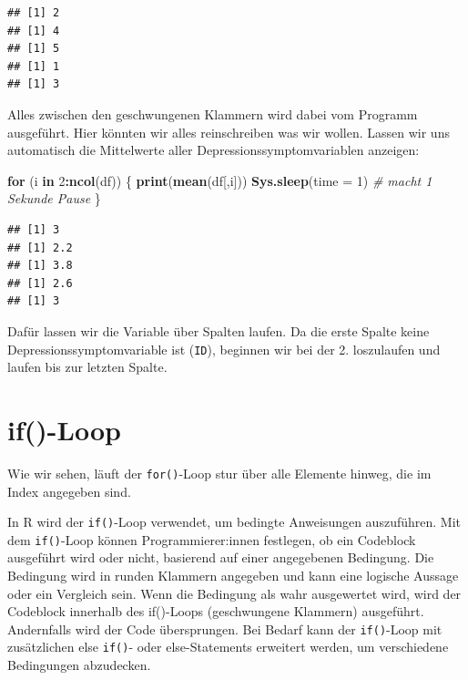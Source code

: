 \documentclass[
]{book}
\newenvironment{Shaded}{\begin{snugshade}}{\end{snugshade}}
\newcommand{\AttributeTok}[1]{\textcolor[rgb]{0.13,0.29,0.53}{#1}}
\newcommand{\CommentTok}[1]{\textcolor[rgb]{0.56,0.35,0.01}{\textit{#1}}}
\newcommand{\ControlFlowTok}[1]{\textcolor[rgb]{0.13,0.29,0.53}{\textbf{#1}}}
\newcommand{\DecValTok}[1]{\textcolor[rgb]{0.00,0.00,0.81}{#1}}
\newcommand{\FunctionTok}[1]{\textcolor[rgb]{0.13,0.29,0.53}{\textbf{#1}}}
\newcommand{\NormalTok}[1]{#1}
\newcommand{\SpecialCharTok}[1]{\textcolor[rgb]{0.81,0.36,0.00}{\textbf{#1}}}
\begin{document}
\begin{Shaded}
\end{Shaded}

\begin{verbatim}
## [1] 2
## [1] 4
## [1] 5
## [1] 1
## [1] 3
\end{verbatim}

Alles zwischen den geschwungenen Klammern wird dabei vom Programm ausgeführt. Hier könnten wir alles reinschreiben was wir wollen. Lassen wir uns automatisch die Mittelwerte aller Depressionssymptomvariablen anzeigen:

\begin{Shaded}
\begin{Highlighting}[]
\ControlFlowTok{for}\NormalTok{ (i }\ControlFlowTok{in} \DecValTok{2}\SpecialCharTok{:}\FunctionTok{ncol}\NormalTok{(df)) \{}
  \FunctionTok{print}\NormalTok{(}\FunctionTok{mean}\NormalTok{(df[,i]))}
  \FunctionTok{Sys.sleep}\NormalTok{(}\AttributeTok{time =} \DecValTok{1}\NormalTok{) }\CommentTok{\# macht 1 Sekunde Pause}
\NormalTok{\}}
\end{Highlighting}
\end{Shaded}

\begin{verbatim}
## [1] 3
## [1] 2.2
## [1] 3.8
## [1] 2.6
## [1] 3
\end{verbatim}

Dafür lassen wir die Variable über Spalten laufen. Da die erste Spalte keine Depressionssymptomvariable ist (\texttt{ID}), beginnen wir bei der 2. loszulaufen und laufen bis zur letzten Spalte.

\section{if()-Loop}\label{if-loop}

Wie wir sehen, läuft der \texttt{for()}-Loop stur über alle Elemente hinweg, die im Index angegeben sind.

In R wird der \texttt{if()}-Loop verwendet, um bedingte Anweisungen auszuführen. Mit dem \texttt{if()}-Loop können Programmierer:innen festlegen, ob ein Codeblock ausgeführt wird oder nicht, basierend auf einer angegebenen Bedingung. Die Bedingung wird in runden Klammern angegeben und kann eine logische Aussage oder ein Vergleich sein. Wenn die Bedingung als wahr ausgewertet wird, wird der Codeblock innerhalb des if()-Loops (geschwungene Klammern) ausgeführt. Andernfalls wird der Code übersprungen. Bei Bedarf kann der \texttt{if()}-Loop mit zusätzlichen else \texttt{if()}- oder else-Statements erweitert werden, um verschiedene Bedingungen abzudecken.
\end{document}
